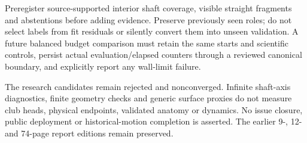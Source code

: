 \documentclass[11pt,letterpaper]{article}
\begin{document}
Preregister source-supported interior shaft coverage, visible straight fragments and
abstentions before adding evidence. Preserve previously seen roles; do not select
labels from fit residuals or silently convert them into unseen validation. A future
balanced budget comparison must retain the same starts and scientific controls,
persist actual evaluation/elapsed counters through a reviewed canonical boundary,
and explicitly report any wall-limit failure.

The research candidates remain rejected and nonconverged. Infinite shaft-axis
diagnostics, finite geometry checks and generic surface proxies do not measure club
heads, physical endpoints, validated anatomy or dynamics. No issue closure, public
deployment or historical-motion completion is asserted. The earlier 9-, 12- and
74-page report editions remain preserved.
\end{document}
